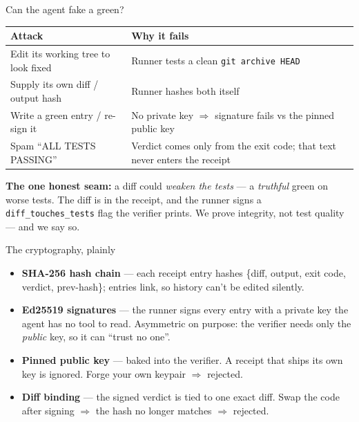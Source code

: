 \documentclass[aspectratio=169,11pt]{beamer}
\begin{document}
\begin{frame}{Can the agent fake a green?}
  \small
  \begin{tabular}{@{}p{}p{}@{}}
    \toprule
    \textbf{Attack} & \textbf{Why it fails} \\
    \midrule
    Edit its working tree to look fixed & Runner tests a clean \texttt{git archive HEAD} \\
    Supply its own diff / output hash & Runner hashes both itself \\
    Write a green entry / re-sign it & No private key $\Rightarrow$ signature fails vs the \alert{pinned} public key \\
    Spam ``ALL TESTS PASSING'' & Verdict comes only from the exit code; that text never enters the receipt \\
    \bottomrule
  \end{tabular}
  \vspace{1em}
  \pause
  \footnotesize \textbf{The one honest seam:} a diff could \emph{weaken the tests} ---
  a \emph{truthful} green on worse tests. The diff is in the receipt, and the runner
  \alert{signs a \texttt{diff\_touches\_tests} flag} the verifier prints. We prove
  integrity, not test quality --- and we say so.
\end{frame}

\begin{frame}{The cryptography, plainly}
  \begin{itemize}
    \item \textbf{SHA-256 hash chain} --- each receipt entry hashes
          \{diff, output, exit code, verdict, prev-hash\}; entries link, so history
          can't be edited silently.
    \item \textbf{Ed25519 signatures} --- the runner signs every entry with a private
          key the agent has no tool to read. Asymmetric on purpose: the verifier needs
          only the \emph{public} key, so it can ``trust no one''.
    \item \textbf{Pinned public key} --- baked into the verifier. A receipt that ships
          its own key is ignored. Forge your own keypair $\Rightarrow$ rejected.
    \item \textbf{Diff binding} --- the signed verdict is tied to one exact diff. Swap
          the code after signing $\Rightarrow$ the hash no longer matches $\Rightarrow$
          rejected.
  \end{itemize}
\end{frame}
\end{document}
